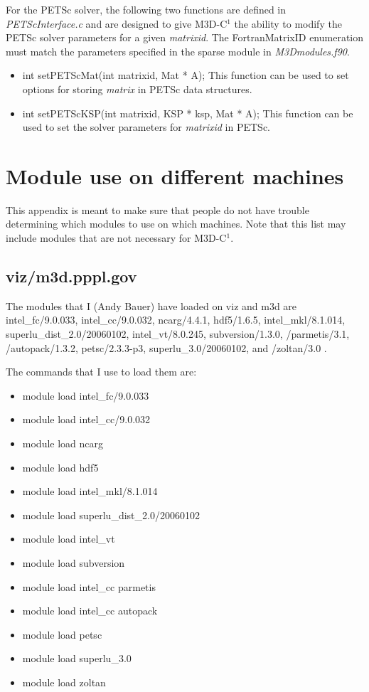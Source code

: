 For the PETSc solver, the following two functions are defined in \textit{PETScInterface.c} and are designed
to give M3D-C$^1$ the ability to modify the PETSc solver parameters for a given \textit{matrixid}.  
The FortranMatrixID enumeration must match the parameters specified in the sparse module in \textit{M3Dmodules.f90}.
\begin{itemize}
\item  int setPETScMat(int matrixid, Mat * A);  This function can be used to set options for storing \textit{matrix}
in PETSc data structures.
\item int setPETScKSP(int matrixid, KSP * ksp, Mat * A); This function can be used to set the solver
parameters for \textit{matrixid} in PETSc.
\end{itemize}


\chapter{Module use on different machines}
This appendix is meant to make sure that people do not have trouble determining which modules to use on 
which machines.  Note that this list may include modules that are not necessary for M3D-C$^1$.

\section{viz/m3d.pppl.gov}
The modules that I (Andy Bauer) have loaded on viz and m3d are  
 intel\_fc/9.0.033,
 intel\_cc/9.0.032,
 ncarg/4.4.1,
 hdf5/1.6.5,
 intel\_mkl/8.1.014,
   superlu\_dist\_2.0/20060102,
   intel\_vt/8.0.245,
   subversion/1.3.0,
   /parmetis/3.1,
  /autopack/1.3.2,
  petsc/2.3.3-p3,
  superlu\_3.0/20060102, and
  /zoltan/3.0 .

The commands that I use to load them are:
\begin{itemize}
\item      module load intel\_fc/9.0.033
\item       module load intel\_cc/9.0.032
\item       module load ncarg
\item       module load hdf5
\item       module load intel\_mkl/8.1.014
\item       module load superlu\_dist\_2.0/20060102
\item       module load intel\_vt
\item       module load subversion
\item       module load intel\_cc parmetis
\item       module load intel\_cc autopack
\item       module load petsc
\item       module load superlu\_3.0
\item       module load zoltan
\end{itemize}

